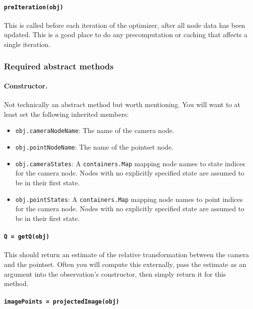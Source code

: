 \paragraph{\texttt{preIteration(obj)}}

This is called before each iteration of the optimizer, after all node data has been updated. This is a good place to 
do any precomputation or caching that affects a single iteration.

\subsubsection{Required abstract methods}

\paragraph{Constructor.}

Not technically an abstract method but worth mentioning. You will want to at least set the following inherited members:
\begin{itemize}
    \item \texttt{obj.cameraNodeName}: The name of the camera node.
    \item \texttt{obj.pointNodeName}: The name of the pointset node.
    \item \texttt{obj.cameraStates}: A \texttt{containers.Map} mapping node names to state indices for the camera node. 
        Nodes with no explicitly specified state are assumed to be in their first state.
    \item \texttt{obj.pointStates}: A \texttt{containers.Map} mapping node names to point indices for the camera node. 
        Nodes with no explicitly specified state are assumed to be in their first state.
\end{itemize}

\paragraph{\texttt{Q = getQ(obj)}}

This should return an estimate of the relative transformation between the camera and the pointset. Often you will
compute this externally, pass the estimate as an argument into the observation's constructor, then simply return it for this method.

\paragraph{\texttt{imagePoints = projectedImage(obj)}}

